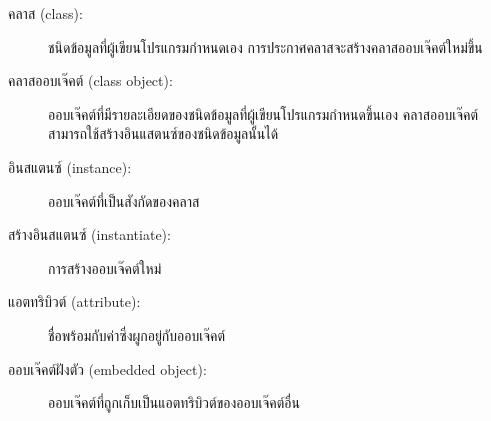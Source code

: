 \begin{description}

\item[คลาส (class):] ชนิดข้อมูลที่ผู้เขียนโปรแกรมกำหนดเอง การประกาศคลาสจะสร้างคลาสออบเจ๊คต์ใหม่ขึ้น


\item[คลาสออบเจ๊คต์ (class object):] ออบเจ๊คต์ที่มีรายละเอียดของชนิดข้อมูลที่ผู้เขียนโปรแกรมกำหนดขึ้นเอง
คลาสออบเจ๊คต์สามารถใช้สร้างอินแสตนซ์ของชนิดข้อมูลนั้นได้

\item[อินสแตนซ์ (instance):] ออบเจ๊คต์ที่เป็นสังกัดของคลาส

\item[สร้างอินสแตนซ์ (instantiate):] การสร้างออบเจ๊คต์ใหม่

\item[แอตทริบิวต์ (attribute):] ชื่อพร้อมกับค่าซึ่งผูกอยู่กับออบเจ๊คต์


\item[ออบเจ๊คต์ฝังตัว (embedded object):] ออบเจ๊คต์ที่ถูกเก็บเป็นแอตทริบิวต์ของออบเจ๊คต์อื่น



\end{description}
